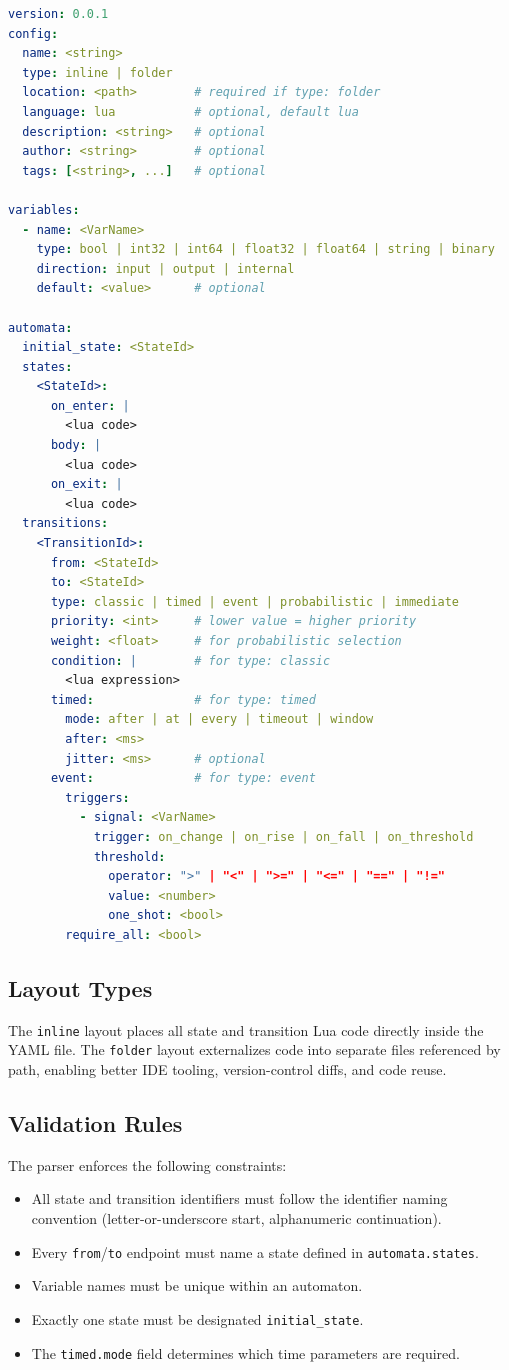 \begin{lstlisting}[language=yaml, caption={YAML DSL top-level structure.}]
version: 0.0.1
config:
  name: <string>
  type: inline | folder
  location: <path>        # required if type: folder
  language: lua           # optional, default lua
  description: <string>   # optional
  author: <string>        # optional
  tags: [<string>, ...]   # optional

variables:
  - name: <VarName>
    type: bool | int32 | int64 | float32 | float64 | string | binary
    direction: input | output | internal
    default: <value>      # optional

automata:
  initial_state: <StateId>
  states:
    <StateId>:
      on_enter: |
        <lua code>
      body: |
        <lua code>
      on_exit: |
        <lua code>
  transitions:
    <TransitionId>:
      from: <StateId>
      to: <StateId>
      type: classic | timed | event | probabilistic | immediate
      priority: <int>     # lower value = higher priority
      weight: <float>     # for probabilistic selection
      condition: |        # for type: classic
        <lua expression>
      timed:              # for type: timed
        mode: after | at | every | timeout | window
        after: <ms>
        jitter: <ms>      # optional
      event:              # for type: event
        triggers:
          - signal: <VarName>
            trigger: on_change | on_rise | on_fall | on_threshold
            threshold:
              operator: ">" | "<" | ">=" | "<=" | "==" | "!="
              value: <number>
              one_shot: <bool>
        require_all: <bool>
\end{lstlisting}

\subsection{Layout Types}

The \texttt{inline} layout places all state and transition Lua code directly inside the YAML file. The \texttt{folder} layout externalizes code into separate files referenced by path, enabling better IDE tooling, version-control diffs, and code reuse.

\subsection{Validation Rules}

The parser enforces the following constraints:
\begin{itemize}
  \item All state and transition identifiers must follow the identifier naming convention (letter-or-underscore start, alphanumeric continuation).
  \item Every \texttt{from}/\texttt{to} endpoint must name a state defined in \texttt{automata.states}.
  \item Variable names must be unique within an automaton.
  \item Exactly one state must be designated \texttt{initial\_state}.
  \item The \texttt{timed.mode} field determines which time parameters are required.
\end{itemize}

